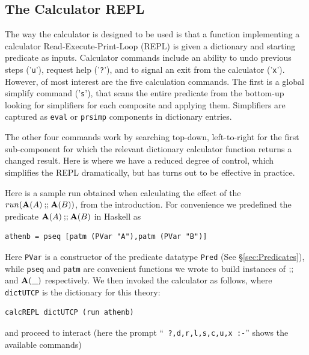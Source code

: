 \subsection{The Calculator REPL}

The way the calculator is designed to be used is
that a function implementing a calculator Read-Execute-Print-Loop (REPL)
is given a dictionary and starting predicate as inputs.
Calculator commands include an ability to undo previous steps ('\texttt{u}'),
request help ('\texttt{?}'),
and to signal an exit from the calculator ('\texttt{x}').
However,
of most interest are the five calculation commands.
The first is a global simplify command ('\texttt{s}'),
that scans the entire predicate from the bottom-up
looking for simplifiers for each composite and applying them.
Simplifiers are captured as \texttt{eval} or \texttt{prsimp} components
in dictionary entries.

The other four commands work by searching top-down, left-to-right for
the first sub-component for which the relevant dictionary calculator
function returns a changed result.
Here is where we have a reduced degree of control,
which simplifies the REPL dramatically,
but has turns out to be effective in practice.

Here is a sample run obtained when calculating the effect of
the $run(\mathbf{A}(A) \mathbin{\mathbf{;\!;}} \mathbf{A}(B))$, from the introduction.
For convenience we predefined the predicate $\mathbf{A}(A) \mathbin{\mathbf{;\!;}} \mathbf{A}(B)$ in Haskell as
\begin{verbatim}
athenb = pseq [patm (PVar "A"),patm (PVar "B")]
\end{verbatim}
Here \texttt{PVar} is a constructor of the predicate datatype \texttt{Pred}
(See \S\ref{sec:Predicates}),
while \texttt{pseq} and \texttt{patm} are convenient functions we wrote
to build instances
of $\mathbin{\mathbf{;\!;}}$ and $\mathbf{A}(\_)$ respectively.
We then invoked the calculator as follows,
where \texttt{dictUTCP} is the dictionary for this theory:
\begin{verbatim}
calcREPL dictUTCP (run athenb)
\end{verbatim}
and proceed to interact
(here the prompt  ``\texttt{ ?,d,r,l,s,c,u,x :-}''
shows the available commands)

